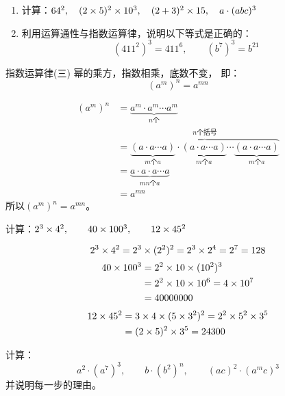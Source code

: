 \begin{ex}
    \begin{enumerate}
        \item 计算：$64^2,\quad (2\times5)^2\times10^3,\quad (2+3)^2\times15,\quad  a\cdot (abc)^3$
        \item 利用运算通性与指数运算律，说明以下等式是正确的：
        \[ (411^2)^3  = 411^6,\qquad (b^7)^3=b^{21} \]
    \end{enumerate}   
\end{ex}

\begin{blk}{指数运算律(三)}
幂的乘方，指数相乘，底数不变，
即：
\[(a^m)^n=a^{mn}\]
\end{blk}

\begin{note}
    \begin{align*}
        (a^m)^n&= \underbrace{a^m\cdot a^m\cdots a^m}_{\text{$n$个}}     \tag{乘方的意义}\\  
&=\overbrace{\underbrace{(a\cdot a\cdots a)}_{\text{$m$个$a$}}\cdot \underbrace{(a\cdot a\cdots a)}_{\text{$m$个$a$}}\cdots \underbrace{(a\cdot a\cdots a)}_{\text{$m$个$a$}}}^{\text{$n$个括号}}\\
&=\underbrace{a\cdot a\cdot a\cdots a}_{\text{$mn$个$a$}}\tag{乘法结合律}\\
&=a^{mn}\tag{乘方的意义}
    \end{align*}
    所以$(a^m)^n=a^{mn}$。
\end{note}

\begin{example}
    计算：$2^3\times 4^2,\qquad 40\times 100^3,\qquad 12\times 45^2$
\end{example}

\begin{solution}
   $$2^3\times 4^2=2^3\times (2^2)^2=2^3\times 2^4=2^7=128$$
   \[\begin{split}
       40\times 100^3&=2^2\times 10\times(10^2)^3\\
       &=2^2\times 10\times 10^6=4\times 10^7\\
       &=40000000
   \end{split}\]
   \[\begin{split}
    12\times 45^2&=3\times 4\times (5\times 3^2)^2=2^2\times 5^2\times 3^5\\
    &=(2\times 5)^2 \times 3^5=24300
   \end{split}\]
\end{solution}

\begin{example}
    计算：
    $$a^2\cdot (a^7)^3,\qquad b\cdot (b^2)^n,\qquad (ac)^2\cdot (a^m c)^3$$
    并说明每一步的理由。
\end{example}

